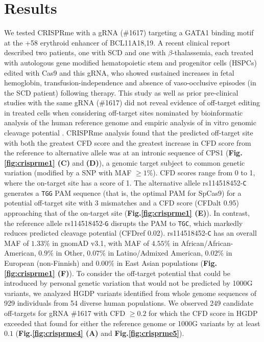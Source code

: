 \documentclass[a4paper, titlepage, openright]{book}
\begin{document}
\section{Results}
We tested CRISPRme with a gRNA (\#1617) targeting a GATA1 binding motif at the +58 erythroid enhancer of BCL11A18,19. A recent clinical report described two patients, one with SCD and one with $\beta$-thalassemia, each treated with autologous gene modified hematopoietic stem and progenitor cells (HSPCs) edited with Cas9 and this gRNA, who showed sustained increases in fetal hemoglobin, transfusion-independence and absence of vaso-occlusive episodes (in the SCD patient) following therapy. This study as well as prior pre-clinical studies with the same gRNA (\#1617) did not reveal evidence of off-target editing in treated cells when considering off-target sites nominated by bioinformatic analysis of the human reference genome and empiric analysis of in vitro genomic cleavage potential \citep{frangoul2021crispr,wu2019highly,demirci2019durable}. CRISPRme analysis found that the predicted off-target site with both the greatest CFD score and the greatest increase in CFD score from the reference to alternative allele was at an intronic sequence of CPS1 (\textbf{Fig.\ref{fig:crisprme1} (C)} and \textbf{(D)}), a genomic target subject to common genetic variation (modified by a SNP with MAF $\geq 1\%$). CFD scores range from 0 to 1, where the on-target site has a score of 1. The alternative allele rs114518452-\texttt{C} generates a \texttt{TGG} PAM sequence (that is, the optimal PAM for SpCas9) for a potential off-target site with 3 mismatches and a CFD score (CFDalt 0.95) approaching that of the on-target site (\textbf{Fig.\ref{fig:crisprme1} (E)}). In contrast, the reference allele rs114518452-\texttt{G} disrupts the PAM to \texttt{TGC}, which markedly reduces predicted cleavage potential (CFDref 0.02). rs114518452-\texttt{C} has an overall MAF of $1.33\%$ in gnomAD v3.1, with MAF of $4.55\%$ in African/African-American, $0.9\%$ in Other, $0.07\%$ in Latino/Admixed American, $0.02\%$ in European (non-Finnish) and $0.00\%$ in East Asian populations (\textbf{Fig.\ref{fig:crisprme1} (F)}). To consider the off-target potential that could be introduced by personal genetic variation that would not be predicted by 1000G variants, we analyzed HGDP variants identified from whole genome sequences of 929 individuals from 54 diverse human populations. We observed 249 candidate off-targets for gRNA \#1617 with CFD $\geq 0.2$ for which the CFD score in HGDP exceeded that found for either the reference genome or 1000G variants by at least $0.1$ (\textbf{Fig.\ref{fig:crisprme4} (A)} and \textbf{Fig.\ref{fig:crisprme5}}). 
\end{document}
